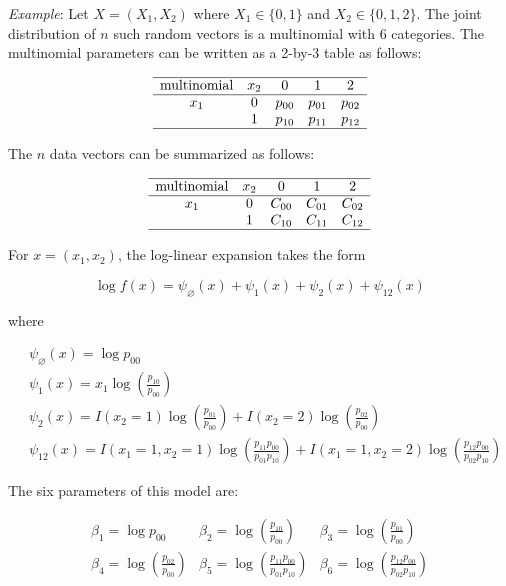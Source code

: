 \emph{Example}: Let \(X = (X_1, X_2)\) where \(X_1 \in \{0, 1\}\) and
\(X_2 \in \{ 0, 1, 2 \}\). The joint distribution of \(n\) such random
vectors is a multinomial with 6 categories. The multinomial parameters
can be written as a 2-by-3 table as follows:

\[
\begin{array}{ccccc}
\hline
\text{multinomial} & x_2 & 0 & 1 & 2 \\
\hline
x_1 & 0 & p_{00} & p_{01} & p_{02} \\
    & 1 & p_{10} & p_{11} & p_{12} \\
\hline
\end{array}
\]

The \(n\) data vectors can be summarized as follows:

\[
\begin{array}{ccccc}
\hline
\text{multinomial} & x_2 & 0 & 1 & 2 \\
\hline
x_1 & 0 & C_{00} & C_{01} & C_{02} \\
    & 1 & C_{10} & C_{11} & C_{12} \\
\hline
\end{array}
\]

For \(x = (x_1, x_2)\), the log-linear expansion takes the form

\[ \log f(x) = \psi_\varnothing(x) + \psi_1(x) + \psi_2(x) + \psi_{12}(x) \]

where

\[
\begin{align}
& \psi_\varnothing(x) = \log p_{00} \\
& \psi_1(x) = x_1 \log \left( \frac{p_{10}}{p_{00}} \right) \\
& \psi_2(x) = I(x_2 = 1) \log \left( \frac{p_{01}}{p_{00}} \right) 
            + I(x_2 = 2) \log \left( \frac{p_{02}}{p_{00}} \right) \\
& \psi_{12}(x) = I(x_1 = 1, x_2 = 1) \log \left( \frac{p_{11}p_{00}}{p_{01}p_{10}} \right)
               + I(x_1 = 1, x_2 = 2) \log \left( \frac{p_{12}p_{00}}{p_{02}p_{10}} \right)
\end{align}
\]

The six parameters of this model are:

\[
\begin{array}{ccc}
\beta_1 = \log p_{00} &
\beta_2 = \log \left( \frac{p_{10}}{p_{00}} \right) &
\beta_3 = \log \left( \frac{p_{01}}{p_{00}} \right) \\
\beta_4 = \log \left( \frac{p_{02}}{p_{00}} \right) &
\beta_5 = \log \left( \frac{p_{11}p_{00}}{p_{01}p_{10}} \right) &
\beta_6 = \log \left( \frac{p_{12}p_{00}}{p_{02}p_{10}} \right)
\end{array}
\]

